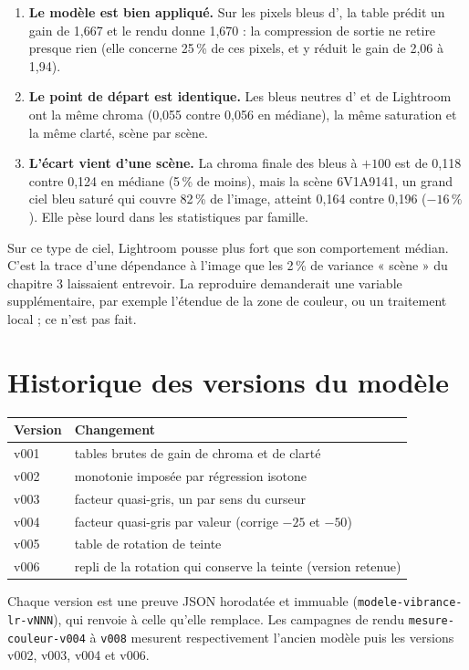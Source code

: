 \begin{enumerate}
\item \textbf{Le modèle est bien appliqué.} Sur les pixels bleus d'\IPR{}, la
table prédit un gain de 1,667 et le rendu donne 1,670 : la compression de
sortie ne retire presque rien (elle concerne 25\,\% de ces pixels, et y réduit
le gain de 2,06 à 1,94).
\item \textbf{Le point de départ est identique.} Les bleus neutres d'\IPR{} et de
Lightroom ont la même chroma (0,055 contre 0,056 en médiane), la même
saturation et la même clarté, scène par scène.
\item \textbf{L'écart vient d'une scène.} La chroma finale des bleus à $+100$
est de 0,118 contre 0,124 en médiane (5\,\% de moins), mais la scène 6V1A9141,
un grand ciel bleu saturé qui couvre 82\,\% de l'image, atteint 0,164 contre
0,196 ($-16\,\%$). Elle pèse lourd dans les statistiques par famille.
\end{enumerate}

Sur ce type de ciel, Lightroom pousse plus fort que son comportement médian.
C'est la trace d'une dépendance à l'image que les 2\,\% de variance « scène »
du chapitre 3 laissaient entrevoir. La reproduire demanderait une variable
supplémentaire, par exemple l'étendue de la zone de couleur, ou un traitement
local ; ce n'est pas fait.


\section{Historique des versions du modèle}
\begin{center}
\begin{tabular}{lp{11cm}}
\toprule
Version & Changement\\
\midrule
v001 & tables brutes de gain de chroma et de clarté\\
v002 & monotonie imposée par régression isotone\\
v003 & facteur quasi-gris, un par sens du curseur\\
v004 & facteur quasi-gris par valeur (corrige $-25$ et $-50$)\\
v005 & table de rotation de teinte\\
v006 & repli de la rotation qui conserve la teinte (version retenue)\\
\bottomrule
\end{tabular}
\end{center}

Chaque version est une preuve JSON horodatée et immuable
(\texttt{modele-vibrance-lr-vNNN}), qui renvoie à celle qu'elle remplace. Les
campagnes de rendu \texttt{mesure-couleur-v004} à \texttt{v008} mesurent
respectivement l'ancien modèle puis les versions v002, v003, v004 et v006.
